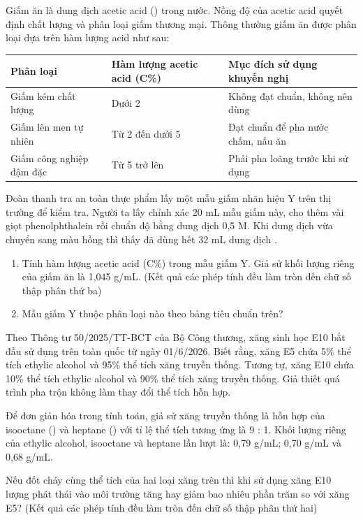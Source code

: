 \begin{tuluyen}
Giấm ăn là dung dịch acetic acid () trong nước. Nồng độ của acetic acid quyết định chất lượng và phân loại giấm thương mại. Thông thường giấm ăn được phân loại dựa trên hàm lượng acid như sau:

\begin{center}
\begin{tabularx}{0.96\textwidth}{>{\centering\arraybackslash}p{3.2cm}>{\centering\arraybackslash}p{4.1cm}Y}
\toprule
Phân loại & Hàm lượng acetic acid (C\%) & Mục đích sử dụng khuyến nghị\\
\midrule
Giấm kém chất lượng & Dưới 2 & Không đạt chuẩn, không nên dùng\\
Giấm lên men tự nhiên & Từ 2 đến dưới 5 & Đạt chuẩn để pha nước chấm, nấu ăn\\
Giấm công nghiệp đậm đặc & Từ 5 trở lên & Phải pha loãng trước khi sử dụng\\
\bottomrule
\end{tabularx}
\end{center}

Đoàn thanh tra an toàn thực phẩm lấy một mẫu giấm nhãn hiệu Y trên thị trường để kiểm tra. Người ta lấy chính xác 20 mL mẫu giấm này, cho thêm vài giọt phenolphthalein rồi chuẩn độ bằng dung dịch  0,5 M. Khi dung dịch vừa chuyển sang màu hồng thì thấy đã dùng hết 32 mL dung dịch .
\begin{enumerate}
\item Tính hàm lượng acetic acid (C\%) trong mẫu giấm Y. Giả sử khối lượng riêng của giấm ăn là 1,045 g/mL. (Kết quả các phép tính đều làm tròn đến chữ số thập phân thứ ba)
\item Mẫu giấm Y thuộc phân loại nào theo bảng tiêu chuẩn trên?
\end{enumerate}
\end{tuluyen}

\begin{tuluyen}
Theo Thông tư 50/2025/TT-BCT của Bộ Công thương, xăng sinh học E10 bắt đầu sử dụng trên toàn quốc từ ngày 01/6/2026. Biết rằng, xăng E5 chứa 5\% thể tích ethylic alcohol và 95\% thể tích xăng truyền thống. Tương tự, xăng E10 chứa 10\% thể tích ethylic alcohol và 90\% thể tích xăng truyền thống. Giả thiết quá trình pha trộn không làm thay đổi thể tích hỗn hợp.

Để đơn giản hóa trong tính toán, giả sử xăng truyền thống là hỗn hợp của isooctane () và heptane () với tỉ lệ thể tích tương ứng là 9 : 1. Khối lượng riêng của ethylic alcohol, isooctane và heptane lần lượt là: 0,79 g/mL; 0,70 g/mL và 0,68 g/mL.

Nếu đốt cháy cùng thể tích của hai loại xăng trên thì khi sử dụng xăng E10 lượng  phát thải vào môi trường tăng hay giảm bao nhiêu phần trăm so với xăng E5? (Kết quả các phép tính đều làm tròn đến chữ số thập phân thứ hai)
\end{tuluyen}

